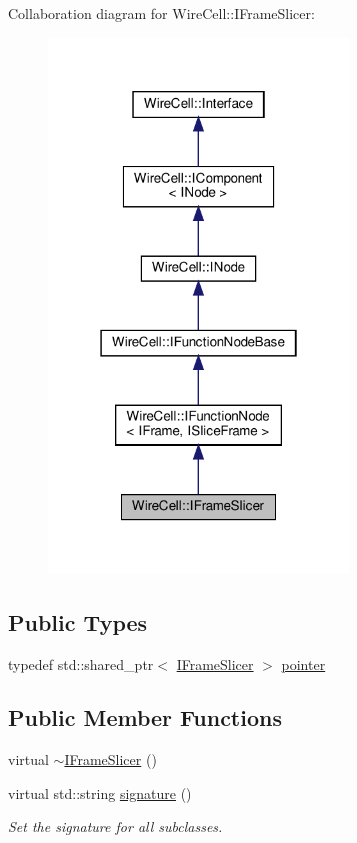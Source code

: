 Collaboration diagram for Wire\+Cell\+:\+:I\+Frame\+Slicer\+:
\nopagebreak
\begin{figure}[H]
\begin{center}
\leavevmode
\includegraphics[width=226pt]{class_wire_cell_1_1_i_frame_slicer__coll__graph}
\end{center}
\end{figure}
\subsection*{Public Types}
\begin{DoxyCompactItemize}
\item 
typedef std\+::shared\+\_\+ptr$<$ \hyperlink{class_wire_cell_1_1_i_frame_slicer}{I\+Frame\+Slicer} $>$ \hyperlink{class_wire_cell_1_1_i_frame_slicer_a8ecaccfa6013e07f0d4f7b0438ef7ee8}{pointer}
\end{DoxyCompactItemize}
\subsection*{Public Member Functions}
\begin{DoxyCompactItemize}
\item 
virtual \hyperlink{class_wire_cell_1_1_i_frame_slicer_a32dc41fc3b3da509688d2fe0ef88335f}{$\sim$\+I\+Frame\+Slicer} ()
\item 
virtual std\+::string \hyperlink{class_wire_cell_1_1_i_frame_slicer_a1af9b9d4cc6a0925925a5d7de316e730}{signature} ()
\begin{DoxyCompactList}\small\item\em Set the signature for all subclasses. \end{DoxyCompactList}\end{DoxyCompactItemize}


